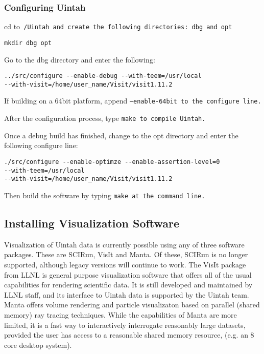 \subsubsection{Configuring Uintah}

cd to\tt ~/Uintah \normalfont and create the following directories:
dbg and opt

\begin{verbatim}
mkdir dbg opt
\end{verbatim}

Go to the dbg directory and enter the following:

\begin{Verbatim}[fontsize=\footnotesize]
../src/configure --enable-debug --with-teem=/usr/local
--with-visit=/home/user_name/Visit/visit1.11.2
\end{Verbatim}

If building on a 64bit platform, append \tt --enable-64bit \normalfont
to the configure line.

After the configuration process, type \tt make \normalfont to compile
Uintah.

Once a debug build has finished, change to the opt directory and enter
the following configure line:

\begin{Verbatim}[fontsize=\footnotesize]
./src/configure --enable-optimze --enable-assertion-level=0 
--with-teem=/usr/local
--with-visit=/home/user_name/Visit/visit1.11.2
\end{Verbatim}

Then build the software by typing \tt make \normalfont at the command line.

\subsection{Installing Visualization Software}

Visualization of Uintah data is currently possible using any of three
software packages.  These are SCIRun, VisIt and Manta.  Of these, SCIRun is
no longer supported, although legacy versions will continue to work.  The
VisIt package from LLNL is general purpose visualization software that offers
all of the usual capabilities for rendering scientific data.  It is still
developed and maintained by LLNL staff, and its interface to Uintah data is
supported by the Uintah team.  Manta offers volume rendering and particle
visualizaton based on parallel (shared memory) ray tracing techniques.
While the capabilities of Manta are more limited, it is a fast way to
interactively interrogate reasonably large datasets, provided the user has
access to a reasonable shared memory resource, (e.g. an 8 core desktop system).

